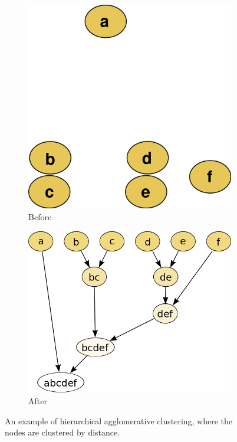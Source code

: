 \begin{figure}[tb]
  \centering
  \begin{subfigure}[b]{0.40\textwidth}
    \centering
    \includegraphics[width=\textwidth]{figures/dendrogram1.png}
    \caption{Before}
  \end{subfigure}
  \hspace{0.10\textwidth}
  \begin{subfigure}[b]{0.40\textwidth}
	\centering
    \includegraphics[width=\textwidth]{figures/dendrogram2.png}
    \caption{After}
  \end{subfigure}
  \caption{An example of hierarchical agglomerative clustering, where the nodes
  are clustered by distance.\label{fig:hac}}
\end{figure}

